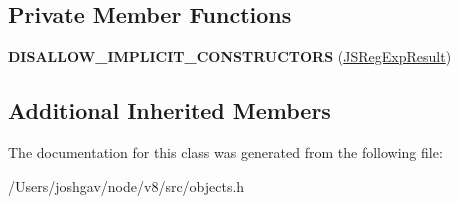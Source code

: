 \subsection*{Private Member Functions}
\begin{DoxyCompactItemize}
\item 
{\bfseries D\+I\+S\+A\+L\+L\+O\+W\+\_\+\+I\+M\+P\+L\+I\+C\+I\+T\+\_\+\+C\+O\+N\+S\+T\+R\+U\+C\+T\+O\+RS} (\hyperlink{classv8_1_1internal_1_1_j_s_reg_exp_result}{J\+S\+Reg\+Exp\+Result})\hypertarget{classv8_1_1internal_1_1_j_s_reg_exp_result_aa28787cb0b8ca60ffd610cc33357c467}{}\label{classv8_1_1internal_1_1_j_s_reg_exp_result_aa28787cb0b8ca60ffd610cc33357c467}

\end{DoxyCompactItemize}
\subsection*{Additional Inherited Members}


The documentation for this class was generated from the following file\+:\begin{DoxyCompactItemize}
\item 
/\+Users/joshgav/node/v8/src/objects.\+h\end{DoxyCompactItemize}
